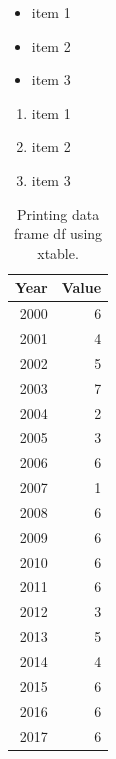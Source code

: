\documentclass{article}
\begin{document}
\begin{itemize}
	\item item 1
	\item item 2
	\item item 3
\end{itemize}

\begin{enumerate}
	\item item 1
	\item item 2
	\item item 3
\end{enumerate}






\begin{table}[ht]
	\centering
	\begin{tabular}{rr}
		\hline
		Year & Value \\ 
		\hline
		2000 & 6 \\ 
		2001 & 4 \\ 
		2002 & 5 \\ 
		2003 & 7 \\ 
		2004 & 2 \\ 
		2005 & 3 \\ 
		2006 & 6 \\ 
		2007 & 1 \\ 
		2008 & 6 \\ 
		2009 & 6 \\ 
		2010 & 6 \\ 
		2011 & 6 \\ 
		2012 & 3 \\ 
		2013 & 5 \\ 
		2014 & 4 \\ 
		2015 & 6 \\ 
		2016 & 6 \\ 
		\hline
		2017 & 6 \\ 
	\end{tabular}
	\caption{Printing data frame df using xtable.} 
	\label{Table:df}
\end{table}

	
\end{document}
